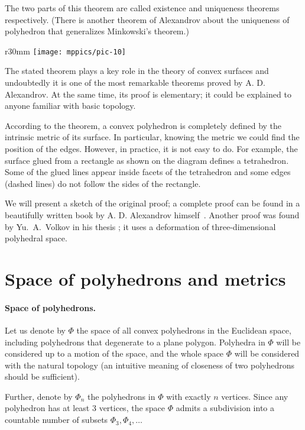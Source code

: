 \documentclass[oneside,a4paper]{article}
\begin{document}
The two parts of this theorem are called existence and uniqueness theorems respectively.
(There is another theorem of Alexandrov about the uniqueness of polyhedron that generalizes Minkowski's theorem.)

\begin{wrapfigure}{r}{30mm}
\vskip-0mm
\centering
\texttt{[image: mppics/pic-10]}
\vskip-0mm
\end{wrapfigure}

The stated theorem plays a key role in the theory of convex surfaces and undoubtedly it is one of the most remarkable theorems proved by A. D. Alexandrov.
At the same time, its proof is elementary;
it could be explained to anyone familiar with basic topology.


According to the theorem, a convex polyhedron is completely defined by the intrinsic metric of its surface.
In particular, knowing the metric we could find the position of the edges.
However, in practice, it is not easy to do.
For example, the surface glued from a rectangle as shown on the diagram defines a tetrahedron.
Some of the glued lines appear inside facets of the tetrahedron and some edges (dashed lines) do not follow the sides of the rectangle.

We will present a sketch of the original proof;
a complete proof can be found in a beautifully written book by A. D. Alexandrov himself~\cite{alexandrov}.
Another proof was found by Yu.~A.~Volkov in his thesis \cite{volkov};
it uses a deformation of three-dimensional polyhedral space.


\section{Space of polyhedrons and metrics}

\paragraph{Space of polyhedrons.}
Let us denote by $\Phi$ the space of all convex polyhedrons in the Euclidean space,
including polyhedrons that degenerate to a plane polygon.
Polyhedra in $\Phi$ will be considered up to a motion of the space, 
and the whole space $\Phi$ will be considered with the natural topology (an intuitive meaning of closeness of two polyhedrons should be sufficient).  

Further, denote by $\Phi_n$ the polyhedrons in $\Phi$ with exactly $n$ vertices.
Since any polyhedron has at least 3 vertices, the space $\Phi$ admits a subdivision into a countable number of subsets $\Phi_3,\Phi_4,\dots$
\end{document}
